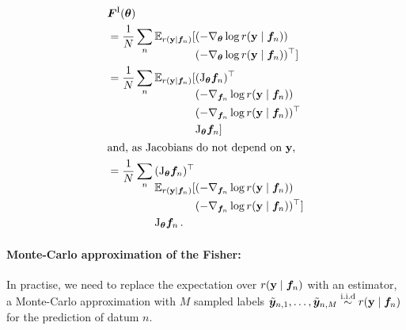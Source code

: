 \begin{align*}
  & \mF^{\text{I}}(\vtheta)
 \\
  & =
 \frac{1}{N} \sum_n
 \E_{r(\rvy \mid \vf_n)}
 [\begin{aligned}[t]
   & (-\nabla_{\vtheta} \log r(\rvy \mid \vf_n)) \\
   & (-\nabla_{\vtheta} \log r(\rvy \mid \vf_n))^{\top}]
 \end{aligned}
 \\
  & =
 \frac{1}{N} \sum_n
 \E_{r(\rvy \mid \vf_n)}
 [\begin{aligned}[t]
   & (\jac_{\vtheta}\vf_n)^{\top} \\
   & (-\nabla_{\vf_n} \log r(\rvy \mid \vf_n)) \\
   & (-\nabla_{\vf_n} \log r(\rvy \mid \vf_n))^{\top} \\
   & \jac_{\vtheta}\vf_n]
 \end{aligned}
 \\
 \shortintertext{and, as Jacobians do not depend on $\rvy$,}
  & =
 \frac{1}{N} \sum_n
 \begin{aligned}[t]
   & (\jac_{\vtheta}\vf_n)^{\top} \\
   & \E_{r(\rvy \mid \vf_n)}
   [(-\nabla_{\vf_n} \log r(\rvy \mid \vf_n)) \\
   & \phantom{\E_{r(\rvy \mid \vf_n)}[}(-\nabla_{\vf_n} \log r(\rvy \mid \vf_n))^{\top}] \\
   & \jac_{\vtheta}\vf_n \,.
 \end{aligned}
\end{align*}

\paragraph{Monte-Carlo approximation of the Fisher:} In practise, we need to replace the expectation over $r({\mathbf{y}} \mid {\bm{f}}_n)$ with an estimator, \eg\,a Monte-Carlo approximation with $M$ sampled labels $\tilde{{\bm{y}}}_{n,1}, \dots, \tilde{{\bm{y}}}_{n, M} \stackrel{\text{i.i.d}}{\sim} r({\mathbf{y}} \mid {\bm{f}}_n)$ for the prediction of datum $n$.

